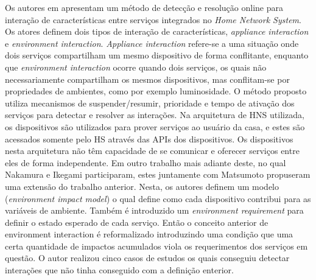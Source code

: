 \cite{Wilson:2008} 

Os autores em \cite{Nakamura:2009} apresentam um método de detecção e resolução online para interação de características entre serviços integrados no \textit{Home Network System}. Os atores definem dois tipos de interação de características, \textit{appliance interaction} e \textit{environment interaction}. \textit{Appliance interaction} refere-se a uma situação onde dois serviços compartilham um mesmo dispositivo de forma conflitante, enquanto que \textit{environment interaction} ocorre quando dois serviços, os quais não necessariamente compartilham os mesmos dispositivos, mas conflitam-se por propriedades de ambientes, como por exemplo luminosidade. O método proposto utiliza mecanismos de suspender/resumir, prioridade e tempo de ativação dos serviços para detectar e resolver as interações. Na arquitetura de HNS utilizada, os dispositivos são utilizados para prover serviços ao usuário da casa, e estes são acessados somente pelo HS através das APIs dos dispositivos. Os dispositivos nesta arquitetura não têm capacidade de se comunicar e oferecer serviços entre eles de forma independente. Em outro trabalho mais adiante \cite{Ikegami:2013} deste, no qual Nakamura e Ikegami participaram, estes juntamente com Matsumoto propuseram uma extensão do trabalho anterior. Nesta, os autores definem um modelo (\textit{environment impact model}) o qual define como cada dispositivo contribui para as variáveis de ambiente. Também é introduzido um \textit{environment requirement} para definir o estado esperado de cada serviço. Então  o conceito anterior de environment interaction é reformalizado introduzindo uma condição que uma certa quantidade de impactos acumulados viola os requerimentos dos serviços em questão. O autor realizou cinco casos de estudos os quais conseguiu detectar interações que não tinha conseguido com a definição enterior.

\cite{Maternaghan:2013}
\cite{Alfakeeh:2016}


